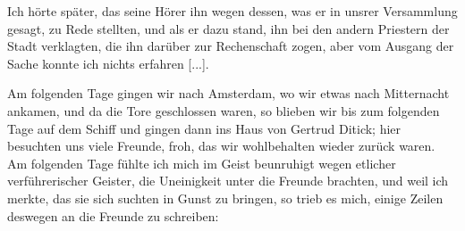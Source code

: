 Ich hörte später, das seine Hörer ihn wegen dessen, was er
in unsrer Versammlung gesagt, zu Rede stellten, und als er dazu
stand, ihn bei den andern Priestern der Stadt verklagten, die ihn
darüber zur Rechenschaft zogen, aber vom Ausgang der Sache
konnte ich nichts erfahren [...].

Am folgenden Tage gingen wir nach Amsterdam, wo wir
etwas nach Mitternacht ankamen, und da die Tore geschlossen
waren, so blieben wir bis zum folgenden Tage auf dem Schiff
und gingen dann ins Haus von Gertrud Ditick; hier besuchten
uns viele Freunde, froh, das wir wohlbehalten wieder zurück
waren. Am folgenden Tage fühlte ich mich im Geist beunruhigt
wegen etlicher verführerischer Geister, die Uneinigkeit unter die
Freunde brachten, und weil ich merkte, das sie sich suchten in Gunst
zu bringen, so trieb es mich, einige Zeilen deswegen an die
Freunde zu schreiben: 


